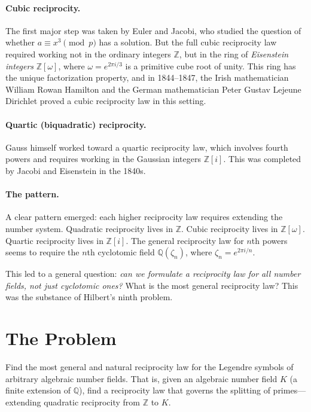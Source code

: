 \paragraph{Cubic reciprocity.} The first major step was taken by Euler and Jacobi, who studied the question of whether $a \equiv x^3 \pmod{p}$ has a solution. But the full cubic reciprocity law required working not in the ordinary integers $\mathbb{Z}$, but in the ring of \emph{Eisenstein integers} $\mathbb{Z}[\omega]$, where $\omega = e^{2\pi i/3}$ is a primitive cube root of unity. This ring has the unique factorization property, and in 1844--1847, the Irish mathematician William Rowan Hamilton and the German mathematician Peter Gustav Lejeune Dirichlet proved a cubic reciprocity law in this setting.

\paragraph{Quartic (biquadratic) reciprocity.} Gauss himself worked toward a quartic reciprocity law, which involves fourth powers and requires working in the Gaussian integers $\mathbb{Z}[i]$. This was completed by Jacobi and Eisenstein in the 1840s.

\paragraph{The pattern.} A clear pattern emerged: each higher reciprocity law requires extending the number system. Quadratic reciprocity lives in $\mathbb{Z}$. Cubic reciprocity lives in $\mathbb{Z}[\omega]$. Quartic reciprocity lives in $\mathbb{Z}[i]$. The general reciprocity law for $n$th powers seems to require the $n$th cyclotomic field $\mathbb{Q}(\zeta_n)$, where $\zeta_n = e^{2\pi i/n}$.

This led to a general question: \emph{can we formulate a reciprocity law for all number fields, not just cyclotomic ones?} What is the most general reciprocity law? This was the substance of Hilbert's ninth problem.

\section{The Problem}

\begin{problem_statement}
Find the most general and natural reciprocity law for the Legendre symbols of arbitrary algebraic number fields. That is, given an algebraic number field $K$ (a finite extension of $\mathbb{Q}$), find a reciprocity law that governs the splitting of primes---extending quadratic reciprocity from $\mathbb{Z}$ to $K$.
\end{problem_statement}


